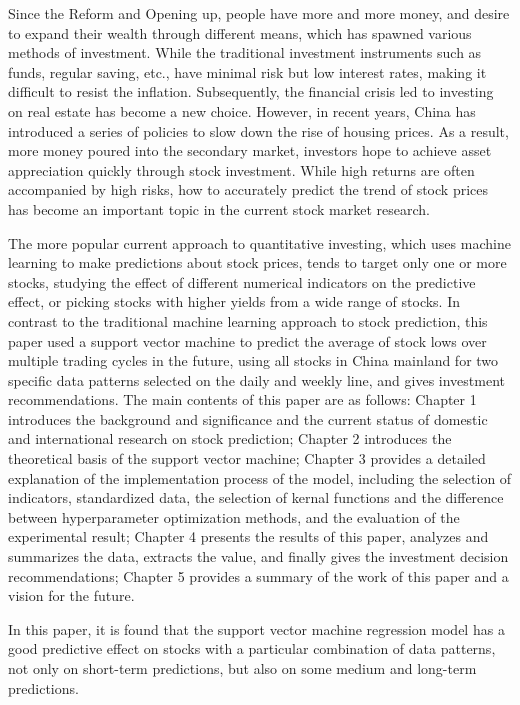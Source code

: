 \begin{enabstract}
    Since the Reform and Opening up, people have more and more money, 
    and desire to expand their wealth through different means, which 
    has spawned various methods of investment. While the traditional 
    investment instruments such as funds, regular saving, etc., have 
    minimal risk but low interest rates, making it difficult to resist 
    the inflation. Subsequently, the financial crisis led to investing
    on real estate has become a new choice. However, in recent years, 
    China has introduced a series of policies to slow down the rise 
    of housing prices. As a result, more money poured into the secondary 
    market, investors hope to achieve asset appreciation quickly through 
    stock investment. While high returns are often accompanied by high 
    risks, how to accurately predict the trend of stock prices has become 
    an important topic in the current stock market research. 

    The more popular current approach to quantitative investing, which 
    uses machine learning to make predictions about stock prices, tends 
    to target only one or more stocks, studying the effect of different 
    numerical indicators on the predictive effect, or picking stocks 
    with higher yields from a wide range of stocks. In contrast to the 
    traditional machine learning approach to stock prediction, this paper 
    used a support vector machine to predict the average of stock lows 
    over multiple trading cycles in the future, using all stocks in China 
    mainland for two specific data patterns selected on the daily and 
    weekly line, and gives investment recommendations. The main contents 
    of this paper are as follows: Chapter 1 introduces the background 
    and significance and the current status of domestic and international 
    research on stock prediction; Chapter 2 introduces the theoretical 
    basis of the support vector machine; Chapter 3 provides a detailed 
    explanation of the implementation process of the model, including 
    the selection of indicators, standardized data, the selection of 
    kernal functions and the difference between hyperparameter optimization 
    methods, and the evaluation of the experimental result; Chapter 4 
    presents the results of this paper, analyzes and summarizes the data, 
    extracts the value, and finally gives the investment decision 
    recommendations; Chapter 5 provides a summary of the work of this 
    paper and a vision for the future.

    In this paper, it is found that the support vector machine regression 
    model has a good predictive effect on stocks with a particular combination 
    of data patterns, not only on short-term predictions, but also on some 
    medium and long-term predictions.

\end{enabstract}
